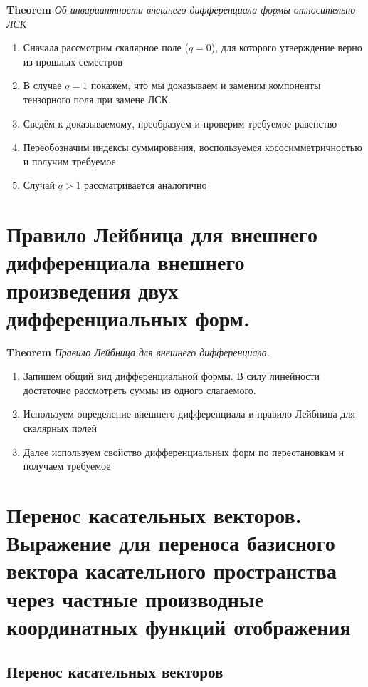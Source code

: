 \documentclass[a4paper, 14pt]{article}
\begin{document}
    \textbf{Theorem} \textit{Об инвариантности внешнего дифференциала формы относительно ЛСК}
    
    \begin{enumerate}
        \item Сначала рассмотрим скалярное поле ($q = 0$), для которого утверждение верно из прошлых семестров
        \item В случае $q = 1$ покажем, что мы доказываем и заменим компоненты тензорного поля при замене ЛСК.
        \item Сведём к доказываемому, преобразуем и проверим требуемое равенство
        \item Переобозначим индексы суммирования, воспользуемся кососимметричностью и получим требуемое
        \item Случай $q > 1$ рассматривается аналогично
    \end{enumerate}
    
    \section{Правило Лейбница для внешнего дифференциала внешнего произведения двух дифференциальных форм.}
    
    \textbf{Theorem} \textit{Правило Лейбница для внешнего дифференциала.}
    
    \begin{enumerate}
        \item Запишем общий вид дифференциальной формы.
        В силу линейности достаточно рассмотреть суммы из одного слагаемого.
        \item Используем определение внешнего дифференциала и правило Лейбница для скалярных полей
        \item Далее используем свойство дифференциальных форм по перестановкам и получаем требуемое
    \end{enumerate}
    
    \section{Перенос касательных векторов.
    Выражение для переноса базисного вектора касательного пространства через частные производные координатных функций
    отображения}
    
    \subsection{Перенос касательных векторов}
    
\end{document}
